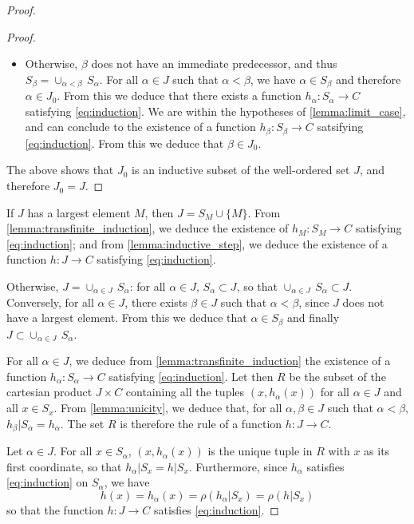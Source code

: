 \documentclass[11pt,a4paper,twoside]{article}
\theoremstyle{definition}
\theoremstyle{plain}
\begin{document}
\begin{proof}
\begin{proof}
\begin{itemize}
  \item Otherwise, $\beta$ does not have an immediate predecessor, and thus $S_\beta = \cup_{\alpha < \beta} \,S_\alpha$.
    For all $\alpha \in J$ such that $\alpha < \beta$, we have $\alpha \in S_\beta$ and therefore $\alpha \in J_0$.
    From this we deduce that there exists a function $h_\alpha : S_\alpha \to C$ satisfying \eqref{eq:induction}.
    We are within the hypotheses of \cref{lemma:limit_case}, and can conclude to the existence of a function $h_\beta : S_\beta \to C$
    satsifying \eqref{eq:induction}. From this we deduce that $\beta \in J_0$.

  \end{itemize}
  The above shows that $J_0$ is an inductive subset of the well-ordered set $J$, and therefore $J_0 = J$.

\end{proof}

If $J$ has a largest element $M$, then $J = S_M \cup \{ M \}$. From \cref{lemma:transfinite_induction}, we deduce the existence
of $h_M : S_M \to C$ satisfying \eqref{eq:induction}; and from \cref{lemma:inductive_step}, we deduce the existence of
a function $h : J \to C$ satisfying \eqref{eq:induction}.

Otherwise, $J = \cup_{\alpha \in J} \,S_\alpha$: for all $\alpha \in J$, $S_\alpha \subset J$, so that $\cup_{\alpha \in J} \,S_\alpha \subset J$.
Conversely, for all $\alpha \in J$, there exists $\beta \in J$ such that $\alpha < \beta$, since $J$ does not have a largest element.
From this we deduce that $\alpha \in S_\beta$ and finally $J \subset \cup_{\alpha \in J} \,S_\alpha$.

For all $\alpha \in J$, we deduce from \cref{lemma:transfinite_induction} the existence of a function
$h_\alpha : S_\alpha \to C$ satisfying \eqref{eq:induction}. Let then $R$ be the subset of the cartesian product $J \times C$
containing all the tuples $( x, h_\alpha (x) )$ for all $\alpha \in J$ and all $x \in S_x$. From \cref{lemma:unicity},
we deduce that, for all $\alpha, \beta \in J$ such that $\alpha < \beta$, $h_\beta | S_\alpha = h_\alpha$.
The set $R$ is therefore the rule of a function $h : J \to C$.

Let $\alpha \in J$. For all $x \in S_\alpha$, $( x, h_\alpha (x) )$ is the unique tuple in $R$ with $x$ as its first coordinate,
so that $h_\alpha | S_x = h | S_x$. Furthermore, since $h_\alpha$ satisfies \eqref{eq:induction} on $S_\alpha$, we have
\begin{equation*}
  h ( x ) = h_\alpha ( x ) = \rho ( h_\alpha | S_x ) = \rho ( h | S_x )
\end{equation*}
so that the function $h : J \to C$ satisfies \eqref{eq:induction}.


\end{proof}
\end{document}
